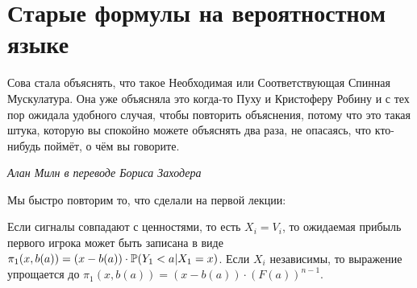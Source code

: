 \section{Старые формулы на вероятностном языке}


\epigraph{Сова стала объяснять, что такое Необходимая или Соответствующая Спинная Мускулатура. Она уже объясняла это когда-то Пуху и Кристоферу Робину и с тех пор ожидала удобного случая, чтобы повторить объяснения, потому что это такая штука, которую вы спокойно можете объяснять два раза, не опасаясь, что кто-нибудь поймёт, о чём вы говорите.}{\textit{Алан Милн в переводе Бориса Заходера}}


Мы быстро повторим то, что сделали на первой лекции:
\begin{myth}
Если сигналы совпадают с ценностями, то есть $ X_{i}=V_{i} $, то ожидаемая прибыль первого игрока может быть записана в виде $\pi_{1}(x,b(a))=(x-b(a))\cdot \P(Y_{1}<a|X_{1}=x)$. Если $X_i$ независимы, то выражение упрощается до $\pi_{1}(x,b(a))=(x-b(a))\cdot (F(a))^{n-1}$.
\end{myth}

